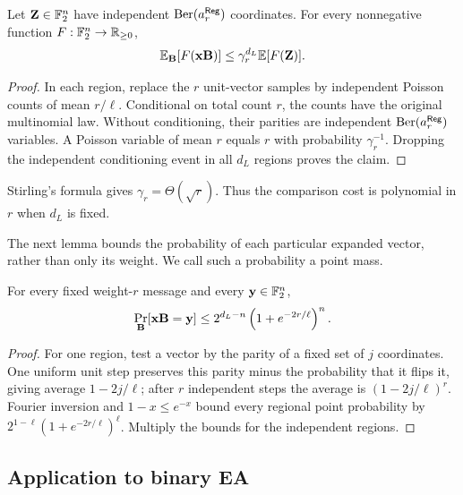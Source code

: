 \begin{lemma}
\label{lem:regular-poisson}
Let $\mathbf Z\in\mathbb F_2^n$ have independent $\operatorname{Ber}(a^{\mathsf{Reg}}_r)$ coordinates.
For every nonnegative function $F:\mathbb F_2^n\to\mathbb R_{\geq0}$,
\begin{equation}
 \mathbb E_{\mathbf B}[F(\mathbf x\mathbf B)]
 \leq\gamma_r^{d_L}\mathbb E[F(\mathbf Z)].
 \label{eq:regular-poisson}
\end{equation}
\end{lemma}

\begin{proof}
In each region, replace the $r$ unit-vector samples by independent Poisson
counts of mean $r/\ell$.  Conditional on total count $r$, the counts have the
original multinomial law.  Without conditioning, their parities are
independent $\operatorname{Ber}(a^{\mathsf{Reg}}_r)$ variables.  A Poisson variable of mean $r$
equals $r$ with probability $\gamma_r^{-1}$.  Dropping the independent
conditioning event in all $d_L$ regions proves the claim.
\end{proof}

Stirling's formula gives $\gamma_r=\Theta(\sqrt r)$.  Thus the comparison
cost is polynomial in $r$ when $d_L$ is fixed.

The next lemma bounds the probability of each particular expanded vector,
rather than only its weight.  We call such a probability a point mass.

\begin{lemma}
\label{lem:regular-point-mass}
For every fixed weight-$r$ message and every $\mathbf y\in\mathbb F_2^n$,
\begin{equation}
 \Pr_{\mathbf B}[\mathbf x\mathbf B=\mathbf y]
 \leq 2^{d_L-n}\left(1+e^{-2r/\ell}\right)^n.
 \label{eq:regular-point-mass}
\end{equation}
\end{lemma}

\begin{proof}
For one region, test a vector by the parity of a fixed set of $j$
coordinates.  One uniform unit step preserves this parity minus the
probability that it flips it, giving average $1-2j/\ell$; after $r$
independent steps the average is $(1-2j/\ell)^r$.  Fourier inversion and
$1-x\leq e^{-x}$ bound every regional point probability by
$2^{1-\ell}(1+e^{-2r/\ell})^\ell$.  Multiply the bounds for the independent
regions.
\end{proof}

\subsection{Application to binary EA}

